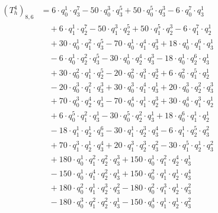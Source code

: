 \begin{align*}(T_{h}^4)_{8,6}&=6\cdot q_0^{1}\cdot q_3^{7}-50\cdot q_0^{3}\cdot q_3^{5}+50\cdot q_0^{5}\cdot q_3^{3}-6\cdot q_0^{7}\cdot q_3^{1}\\
&\quad +6\cdot q_1^{1}\cdot q_2^{7}-50\cdot q_1^{3}\cdot q_2^{5}+50\cdot q_1^{5}\cdot q_2^{3}-6\cdot q_1^{7}\cdot q_2^{1}\\
&\quad +30\cdot q_0^{1}\cdot q_1^{2}\cdot q_3^{5}-70\cdot q_0^{1}\cdot q_1^{4}\cdot q_3^{3}+18\cdot q_0^{1}\cdot q_1^{6}\cdot q_3^{1}\\
&\quad -6\cdot q_0^{1}\cdot q_2^{2}\cdot q_3^{5}-30\cdot q_0^{1}\cdot q_2^{4}\cdot q_3^{3}-18\cdot q_0^{1}\cdot q_2^{6}\cdot q_3^{1}\\
&\quad +30\cdot q_0^{2}\cdot q_1^{1}\cdot q_2^{5}-20\cdot q_0^{2}\cdot q_1^{3}\cdot q_2^{3}+6\cdot q_0^{2}\cdot q_1^{5}\cdot q_2^{1}\\
&\quad -20\cdot q_0^{3}\cdot q_1^{2}\cdot q_3^{3}+30\cdot q_0^{3}\cdot q_1^{4}\cdot q_3^{1}+20\cdot q_0^{3}\cdot q_2^{2}\cdot q_3^{3}\\
&\quad +70\cdot q_0^{3}\cdot q_2^{4}\cdot q_3^{1}-70\cdot q_0^{4}\cdot q_1^{1}\cdot q_2^{3}+30\cdot q_0^{4}\cdot q_1^{3}\cdot q_2^{1}\\
&\quad +6\cdot q_0^{5}\cdot q_1^{2}\cdot q_3^{1}-30\cdot q_0^{5}\cdot q_2^{2}\cdot q_3^{1}+18\cdot q_0^{6}\cdot q_1^{1}\cdot q_2^{1}\\
&\quad -18\cdot q_1^{1}\cdot q_2^{1}\cdot q_3^{6}-30\cdot q_1^{1}\cdot q_2^{3}\cdot q_3^{4}-6\cdot q_1^{1}\cdot q_2^{5}\cdot q_3^{2}\\
&\quad +70\cdot q_1^{3}\cdot q_2^{1}\cdot q_3^{4}+20\cdot q_1^{3}\cdot q_2^{3}\cdot q_3^{2}-30\cdot q_1^{5}\cdot q_2^{1}\cdot q_3^{2}\\
&\quad +180\cdot q_0^{1}\cdot q_1^{2}\cdot q_2^{2}\cdot q_3^{3}+150\cdot q_0^{1}\cdot q_1^{2}\cdot q_2^{4}\cdot q_3^{1}\\
&\quad -150\cdot q_0^{1}\cdot q_1^{4}\cdot q_2^{2}\cdot q_3^{1}+150\cdot q_0^{2}\cdot q_1^{1}\cdot q_2^{1}\cdot q_3^{4}\\
&\quad +180\cdot q_0^{2}\cdot q_1^{1}\cdot q_2^{3}\cdot q_3^{2}-180\cdot q_0^{2}\cdot q_1^{3}\cdot q_2^{1}\cdot q_3^{2}\\
&\quad -180\cdot q_0^{3}\cdot q_1^{2}\cdot q_2^{2}\cdot q_3^{1}-150\cdot q_0^{4}\cdot q_1^{1}\cdot q_2^{1}\cdot q_3^{2}\end{align*}
